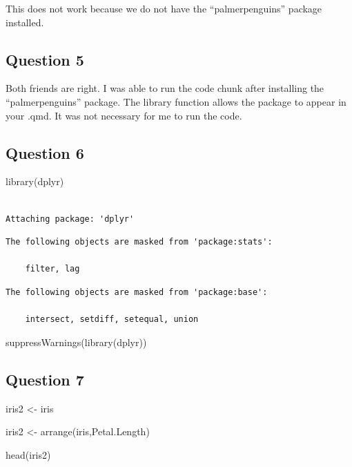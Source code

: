 \documentclass[
  letterpaper,
  DIV=11,
  numbers=noendperiod]{scrartcl}
\newenvironment{Shaded}{\begin{snugshade}}{\end{snugshade}}
\newcommand{\FunctionTok}[1]{\textcolor[rgb]{0.28,0.35,0.67}{#1}}
\newcommand{\NormalTok}[1]{\textcolor[rgb]{0.00,0.23,0.31}{#1}}
\newcommand{\OtherTok}[1]{\textcolor[rgb]{0.00,0.23,0.31}{#1}}
\begin{document}
This does not work because we do not have the ``palmerpenguins'' package
installed.

\subsection{Question 5}\label{question-5}

Both friends are right. I was able to run the code chunk after
installing the ``palmerpenguins'' package. The library function allows
the package to appear in your .qmd. It was not necessary for me to run
the code.

\subsection{Question 6}\label{question-6}

\begin{Shaded}
\begin{Highlighting}[]
\FunctionTok{library}\NormalTok{(dplyr)}
\end{Highlighting}
\end{Shaded}

\begin{verbatim}

Attaching package: 'dplyr'
\end{verbatim}

\begin{verbatim}
The following objects are masked from 'package:stats':

    filter, lag
\end{verbatim}

\begin{verbatim}
The following objects are masked from 'package:base':

    intersect, setdiff, setequal, union
\end{verbatim}

\begin{Shaded}
\begin{Highlighting}[]
\FunctionTok{suppressWarnings}\NormalTok{(}\FunctionTok{library}\NormalTok{(dplyr))}
\end{Highlighting}
\end{Shaded}

\subsection{Question 7}\label{question-7}

\begin{Shaded}
\begin{Highlighting}[]
\NormalTok{iris2 }\OtherTok{\textless{}{-}}\NormalTok{ iris}

\NormalTok{iris2 }\OtherTok{\textless{}{-}} \FunctionTok{arrange}\NormalTok{(iris,Petal.Length)}

\FunctionTok{head}\NormalTok{(iris2)}
\end{Highlighting}
\end{Shaded}
\end{document}
